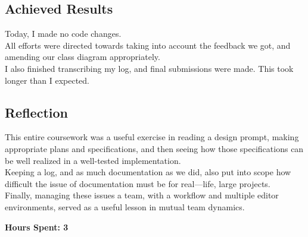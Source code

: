\documentclass[titlepage, 12pt]{extarticle}
\begin{document}
\subsection{Achieved Results}
Today, I made no code changes.\\

All efforts were directed towards taking into account the feedback we got, and amending our class diagram appropriately.\\

I also finished transcribing my log, and final submissions were made. This took longer than I expected.

\subsection{Reflection}
This entire coursework was a useful exercise in reading a design prompt, making
appropriate plans and specifications, and then seeing how those specifications
can be well realized in a well-tested implementation.\\

Keeping a log, and as much documentation as we did, also put into scope how
difficult the issue of documentation must be for real---life, large projects.\\

Finally, managing these issues a team, with a workflow and multiple editor
environments, served as a useful lesson in mutual team dynamics.

{\bf Hours Spent: 3 }
\end{document}
